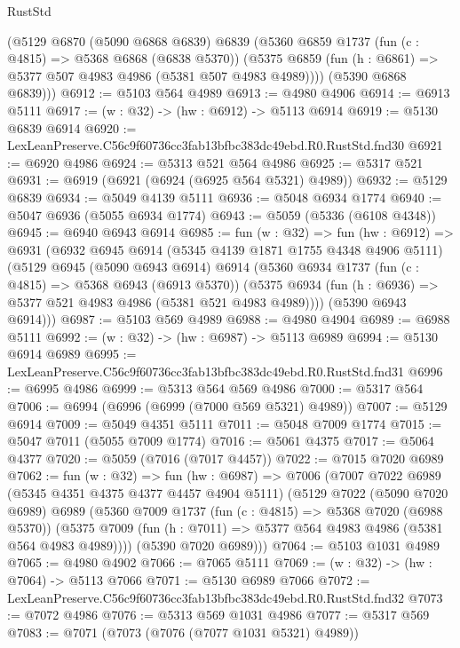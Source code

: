 \begin{lexlean}{RustStd}
\begin{coremodule}
      (@5129
        @6870
        (@5090 @6868 @6839)
        @6839
        (@5360
          @6859
          @1737
          (fun (c : @4815) => @5368 @6868 (@6838 @5370))
          (@5375 @6859 (fun (h : @6861) => @5377 @507 @4983 @4986 (@5381 @507 @4983 @4989))))
        (@5390 @6868 @6839)))
@6912 := @5103 @564 @4989
@6913 := @4980 @4906
@6914 := @6913 @5111
@6917 := (w : @32) -> (hw : @6912) -> @5113 @6914
@6919 := @5130 @6839 @6914
@6920 := LexLeanPreserve.C56c9f60736cc3fab13bfbc383dc49ebd.R0.RustStd.fnd30
@6921 := @6920 @4986
@6924 := @5313 @521 @564 @4986
@6925 := @5317 @521
@6931 := @6919 (@6921 (@6924 (@6925 @564 @5321) @4989))
@6932 := @5129 @6839
@6934 := @5049 @4139 @5111
@6936 := @5048 @6934 @1774
@6940 := @5047 @6936 (@5055 @6934 @1774)
@6943 := @5059 (@5336 (@6108 @4348))
@6945 := @6940 @6943 @6914
@6985 := fun (w : @32) =>
  fun (hw : @6912) =>
  @6931
    (@6932
      @6945
      @6914
      (@5345 @4139 @1871 @1755 @4348 @4906 @5111)
      (@5129
        @6945
        (@5090 @6943 @6914)
        @6914
        (@5360
          @6934
          @1737
          (fun (c : @4815) => @5368 @6943 (@6913 @5370))
          (@5375 @6934 (fun (h : @6936) => @5377 @521 @4983 @4986 (@5381 @521 @4983 @4989))))
        (@5390 @6943 @6914)))
@6987 := @5103 @569 @4989
@6988 := @4980 @4904
@6989 := @6988 @5111
@6992 := (w : @32) -> (hw : @6987) -> @5113 @6989
@6994 := @5130 @6914 @6989
@6995 := LexLeanPreserve.C56c9f60736cc3fab13bfbc383dc49ebd.R0.RustStd.fnd31
@6996 := @6995 @4986
@6999 := @5313 @564 @569 @4986
@7000 := @5317 @564
@7006 := @6994 (@6996 (@6999 (@7000 @569 @5321) @4989))
@7007 := @5129 @6914
@7009 := @5049 @4351 @5111
@7011 := @5048 @7009 @1774
@7015 := @5047 @7011 (@5055 @7009 @1774)
@7016 := @5061 @4375
@7017 := @5064 @4377
@7020 := @5059 (@7016 (@7017 @4457))
@7022 := @7015 @7020 @6989
@7062 := fun (w : @32) =>
  fun (hw : @6987) =>
  @7006
    (@7007
      @7022
      @6989
      (@5345 @4351 @4375 @4377 @4457 @4904 @5111)
      (@5129
        @7022
        (@5090 @7020 @6989)
        @6989
        (@5360
          @7009
          @1737
          (fun (c : @4815) => @5368 @7020 (@6988 @5370))
          (@5375 @7009 (fun (h : @7011) => @5377 @564 @4983 @4986 (@5381 @564 @4983 @4989))))
        (@5390 @7020 @6989)))
@7064 := @5103 @1031 @4989
@7065 := @4980 @4902
@7066 := @7065 @5111
@7069 := (w : @32) -> (hw : @7064) -> @5113 @7066
@7071 := @5130 @6989 @7066
@7072 := LexLeanPreserve.C56c9f60736cc3fab13bfbc383dc49ebd.R0.RustStd.fnd32
@7073 := @7072 @4986
@7076 := @5313 @569 @1031 @4986
@7077 := @5317 @569
@7083 := @7071 (@7073 (@7076 (@7077 @1031 @5321) @4989))

\end{coremodule}
\end{lexlean}
